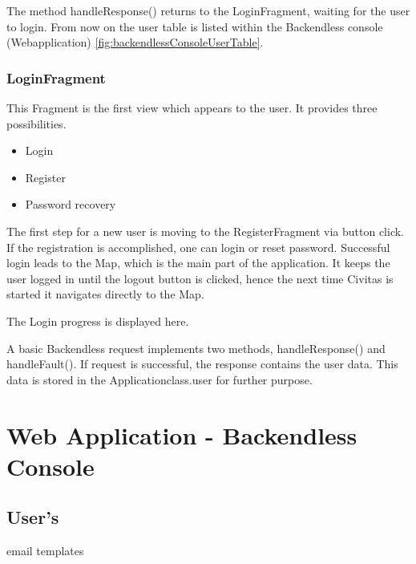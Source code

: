 \fbox{

}

The method handleResponse() returns to the LoginFragment, waiting for the user to login. From now on the user table is listed within the Backendless console (Webapplication) \ref{fig:backendlessConsoleUserTable}.


\subsubsection{LoginFragment}
This Fragment is the first view which appears to the user. It provides three possibilities. 
\begin{itemize}
\item Login
\item Register
\item Password recovery
\end{itemize}
The first step for a new user is moving to the RegisterFragment via button click.
If the registration is accomplished, one can login or reset password.
Successful login leads to the Map, which is the main part of the application. It keeps the user logged in until the logout button is clicked, hence the next time Civitas is started it navigates directly to the Map.

The Login progress is displayed here. 

\fbox{

}

A basic Backendless request implements two methods, handleResponse() and handleFault(). If request is successful, the response contains the user data. This data is stored in the Applicationclass.user for further purpose.


\section{Web Application - Backendless Console}

\subsection{User's}
email templates
